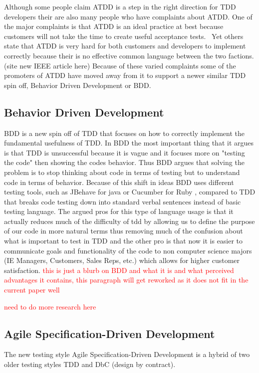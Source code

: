 \documentclass{sig-alternate}
\newcommand{\mycomment}[1]{\textcolor{red}{#1}}
\begin{document}
Although some people claim ATDD is a step in the right direction for TDD developers their are also many people who have complaints about ATDD.  One of the major complaints is that ATDD is an ideal practice at best because customers will not take the time to create useful acceptance tests.~\cite{Hammond:2012} Yet others state that ATDD is very hard for both customers and developers to implement correctly because their is no effective common language between the two factions.(site new IEEE article here)  Because of these varied complaints some of the promoters of ATDD have moved away from it to support a newer similar TDD spin off, Behavior Driven Development or BDD.

\subsection{Behavior Driven Development}
BDD is a new spin off of TDD that focuses on how to correctly implement the fundamental usefulness of TDD.  In BDD the most important thing that it argues is that TDD is unsuccessful because it is vague and it focuses more on "testing the code" then showing the codes behavior.  Thus BDD argues that solving the problem is to stop thinking about code in terms of testing but to understand code in terms of behavior.  Because of this shift in ideas BDD uses different testing tools, such as JBehave for java or Cucumber for Ruby \cite{Soeken:2012}, compared to TDD that breaks code testing down into standard verbal sentences instead of basic testing language.  The argued pros for this type of language usage is that it actually reduces much of the difficulty of tdd by allowing us to define the purpose of our code in more natural terms thus removing much of the confusion about what is important to test in TDD and the other pro is that now it is easier to communicate goals and functionality of the code to non computer science majors (IE Managers, Customers, Sales Reps, etc.) which allows for higher customer satisfaction.
\mycomment{this is just a blurb on BDD and what it is and what perceived advantages it contains, this paragraph will get reworked as it does not fit in the current paper well}

\mycomment{need to do more research here}

\subsection{Agile Specification-Driven Development}
The new testing style Agile Specification-Driven Development is a hybrid of two older testing styles TDD and DbC (design by contract).
\end{document}
